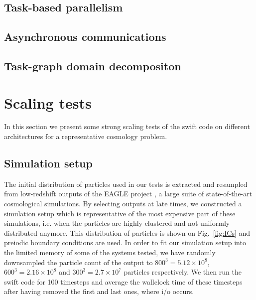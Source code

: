 \documentclass{sig-alternate-05-2015}
\newcommand{\swift}{{\sc swift}\xspace}
\begin{document}
\subsection{Task-based parallelism}

\subsection{Asynchronous communications}

\subsection{Task-graph domain decompositon}


\section{Scaling tests}

In this section we present some strong scaling tests of the \swift code on different
architectures for a representative cosmology problem.

\subsection{Simulation setup}

The initial distribution of particles used in our tests is extracted and
resampled from low-redshift outputs of the EAGLE project \cite{Schaye2015}, a
large suite of state-of-the-art cosmological simulations. By selecting outputs
at late times, we constructed a simulation setup which is representative of the
most expensive part of these simulations, i.e. when the particles are
highly-clustered and not uniformly distributed anymore. This distribution of
particles is shown on Fig.~\ref{fig:ICs} and preiodic boundary conditions are
used. In order to fit our simulation setup into the limited memory of some of
the systems tested, we have randomly downsampled the particle count of the
output to $800^3=5.12\times10^8$, $600^3=2.16\times10^8$ and
$300^3=2.7\times10^7$ particles respectively. We then run the \swift code for
100 timesteps and average the wallclock time of these timesteps after having
removed the first and last ones, where i/o occurs.
\end{document}
